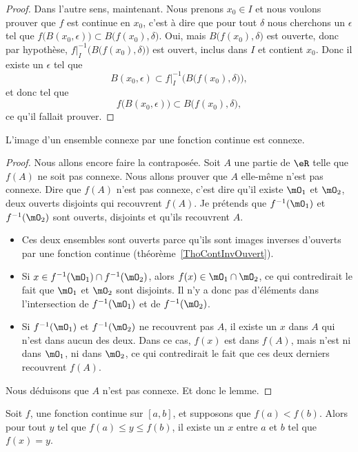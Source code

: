 \begin{proof}
Dans l'autre sens, maintenant. Nous prenons $x_0\in I$ et nous voulons prouver que $f$ est continue en $x_0$, c'est à dire que pour tout $\delta$ nous cherchons un $\epsilon$ tel que $f\big( B(x_0,\epsilon) \big)\subset B\big( f(x_0),\delta \big)$. Oui, mais $B\big( f(x_0),\delta \big)$ est ouverte, donc par hypothèse, $f|_I^{-1}\Big( B\big( f(x_0),\delta \big) \Big)$ est ouvert, inclus dans $I$ et contient $x_0$. Donc il existe un $\epsilon$ tel que
\[
  B(x_0,\epsilon)\subset f|_I^{-1}\Big( B\big( f(x_0),\delta \big) \Big),
\]
et donc tel que
\[
  f\big( B(x_0,\epsilon) \big)\subset B\big( f(x_0),\delta \big),
\]
ce qu'il fallait prouver.
\end{proof}

\begin{lemma}   \label{LemConncontconn}
L'image d'un ensemble connexe par une fonction continue est connexe.
\end{lemma}

\begin{proof}
Nous allons encore faire la contraposée. Soit $A$ une partie de $\eR$ telle que $f(A)$ ne soit pas connexe. Nous allons prouver que $A$ elle-même n'est pas connexe. Dire que $f(A)$ n'est pas connexe, c'est dire qu'il existe $\mO_1$ et $\mO_2$, deux ouverts disjoints qui recouvrent $f(A)$. Je prétends que $f^{-1}(\mO_1)$ et $f^{-1}(\mO_2)$ sont ouverts, disjoints et qu'ils recouvrent $A$.
\begin{itemize}
\item Ces deux ensembles sont ouverts parce qu'ils sont images inverses d'ouverts par une fonction continue (théorème~\ref{ThoContInvOuvert}).
\item Si $x\in f^{-1}(\mO_1)\cap f^{-1}(\mO_2)$, alors $f(x)\in \mO_1\cap\mO_2$, ce qui contredirait le fait que $\mO_1$ et $\mO_2$ sont disjoints. Il n'y a donc pas d'éléments dans l'intersection de $f^{-1}(\mO_1)$ et de $f^{-1}(\mO_2)$.
\item Si $f^{-1}(\mO_1)$ et $f^{-1}(\mO_2)$ ne recouvrent pas $A$, il existe un $x$ dans $A$ qui n'est dans aucun des deux. Dans ce cas, $f(x)$ est dans $f(A)$, mais n'est ni dans $\mO_1$, ni dans $\mO_2$, ce qui contredirait le fait que ces deux derniers recouvrent $f(A)$.
\end{itemize}
Nous déduisons que $A$ n'est pas connexe. Et donc le lemme.
\end{proof}

\begin{theorem}        \label{ThoValInter}
Soit $f$, une fonction continue sur $[a,b]$, et supposons que $f(a)<f(b)$. Alors pour tout $y$ tel que $f(a)\leq y\leq f(b)$, il existe un $x$ entre $a$ et $b$ tel que $f(x)=y$.
\end{theorem}

